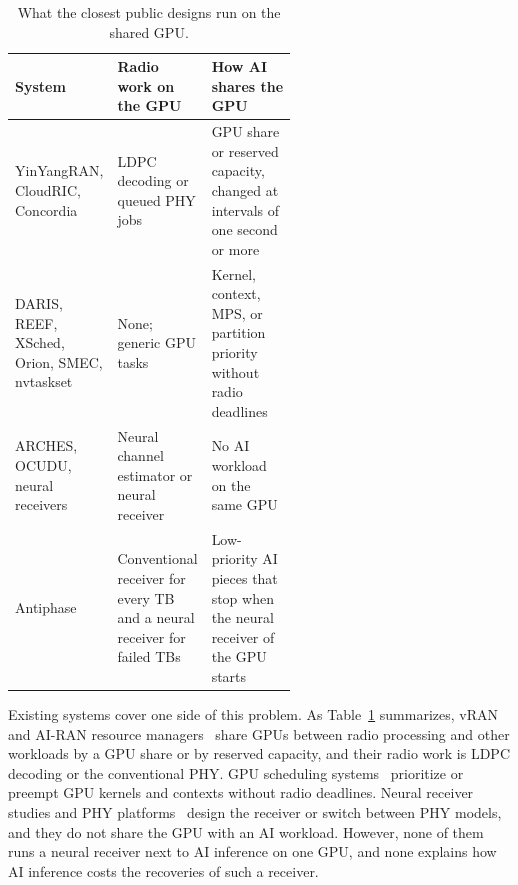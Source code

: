 \documentclass[acmsmall,screen,review,anonymous]{acmart}
\newcommand{\sys}{Antiphase\xspace}
\begin{document}
\begin{table}[t]
\caption{What the closest public designs run on the shared GPU.}
\label{tab:closest}
\footnotesize
\begin{tabularx}{\linewidth}{@{}>{\raggedright\arraybackslash}p{0.25\linewidth}>{\raggedright\arraybackslash}p{0.31\linewidth}>{\raggedright\arraybackslash}X@{}}
\toprule
System & Radio work on the GPU & How AI shares the GPU \\
\midrule
YinYangRAN, CloudRIC, Concordia & LDPC decoding or queued PHY jobs & GPU share or reserved capacity, changed at intervals of one second or more \\
DARIS, REEF, XSched, Orion, SMEC, nvtaskset & None; generic GPU tasks & Kernel, context, MPS, or partition priority without radio deadlines \\
ARCHES, OCUDU, neural receivers & Neural channel estimator or neural receiver & No AI workload on the same GPU \\
\sys & Conventional receiver for every TB and a neural receiver for failed TBs & Low-priority AI pieces that stop when the neural receiver of the GPU starts \\
\bottomrule
\end{tabularx}
\end{table}

Existing systems cover one side of this problem. As Table~\ref{tab:closest} summarizes, vRAN and AI-RAN
resource managers~\cite{yinyangran,cloudric,concordia,interplay,caora,haf,distributedairan} share GPUs
between radio processing and other workloads by a GPU share or by reserved capacity, and their radio work is
LDPC decoding or the conventional PHY. GPU scheduling systems~\cite{daris,reef,xsched,orion,smec,nvtaskset}
prioritize or preempt GPU kernels and contexts without radio deadlines. Neural receiver studies and PHY
platforms~\cite{deeprx,nrx5g,nrxrt,arches,ocudu} design the receiver or switch between PHY models, and they
do not share the GPU with an AI workload. However, none of them runs a neural receiver next to AI inference
on one GPU, and none explains how AI inference costs the recoveries of such a receiver.
\end{document}
